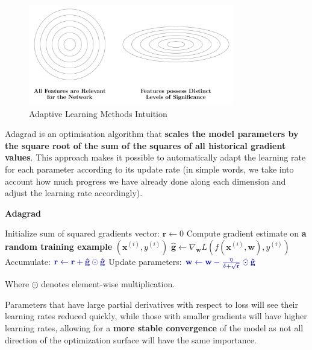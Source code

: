 \begin{figure}[htbp]
\centering
\includegraphics[width=0.8\textwidth]{tikz/chapter3 - Features Importance.pdf}
\caption{Adaptive Learning Methods Intuition}
\end{figure}

Adagrad is an optimisation algorithm that \textbf{scales the model parameters by the square root of the sum of the squares of all historical gradient values}. This approach makes it possible to automatically adapt the learning rate for each parameter according to its update rate (in simple words, we take into account how much progress we have already done along each dimension and adjust the learning rate accordingly). 
\begin{algorithm}
\renewcommand\thealgorithm{}
\caption{\textbf{\textcolor{mygreen}{Adagrad}}}
\begin{algorithmic}[1]
\STATE Initialize sum of squared gradients vector: $\mathbf{r} \leftarrow 0$
\STATE Compute gradient estimate on \textbf{\textcolor{myred}{a random training example}} $(\mathbf{x}^{(i)}, y^{(i)})$
\STATE $\mathbf{\hat{g}} \leftarrow \nabla_{\mathbf{w}} L(f(\mathbf{x}^{(i)},\mathbf{w}), y^{(i)})$
\STATE Accumulate:
$\textcolor{mybluee}{\mathbf{r} \leftarrow \mathbf{r} + \mathbf{\hat{g}} \odot \mathbf{\hat{g}}}$
\STATE Update parameters:
$\textcolor{mybluee}{\mathbf{w} \leftarrow \mathbf{w} - \frac{\eta}{\delta + \sqrt{\mathbf{r}}} \odot \mathbf{\hat{g}}}$ 
\ENDWHILE
\end{algorithmic}
\end{algorithm}

Where $\odot$ denotes element-wise multiplication.

Parameters that have large partial derivatives with respect to loss will see their learning rates reduced quickly, while those with smaller gradients will have higher learning rates, allowing for a \textbf{more stable convergence} of the model as not all direction of the optimization surface will have the same importance. 

